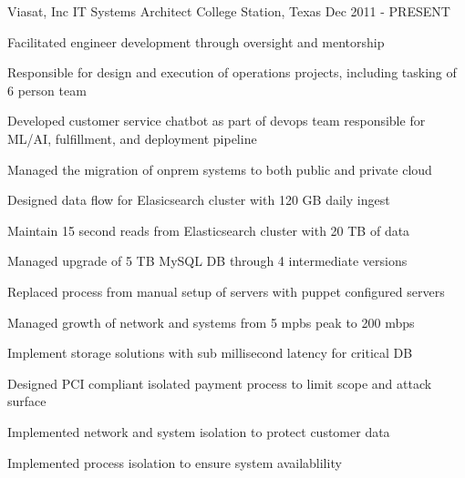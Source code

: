 

\begin{cventries}

  \cventry
    {Viasat, Inc} %
    {IT Systems Architect} %
    {College Station, Texas} %
    {Dec 2011 - PRESENT} %
    {
      \begin{cvitems} %
        \item {Facilitated engineer development through oversight and mentorship}
        \item {Responsible for design and execution of operations projects, including tasking of 6 person team}
        \item {Developed customer service chatbot as part of devops team responsible for ML/AI, fulfillment, and deployment pipeline}
        \item {Managed the migration of onprem systems to both public and private cloud}
        \item {Designed data flow for Elasicsearch cluster with 120 GB daily ingest}
        \item {Maintain 15 second reads from Elasticsearch cluster with 20 TB of data}
        \item {Managed upgrade of 5 TB MySQL DB through 4 intermediate versions}
        \item {Replaced process from manual setup of servers with puppet configured servers}
        \item {Managed growth of network and systems from 5 mpbs peak to 200 mbps}
        \item {Implement storage solutions with sub millisecond latency for critical DB}
        \item {Designed PCI compliant isolated payment process to limit scope and attack surface}
        \item {Implemented network and system isolation to protect customer data}
        \item {Implemented process isolation to ensure system availablility}
      \end{cvitems}
    }


\end{cventries}

